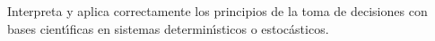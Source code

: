 Interpreta y aplica correctamente los principios de la toma de
decisiones con bases cient\'{\i}ficas en sistemas determin\'{\i}sticos
o estoc\'{a}sticos.
